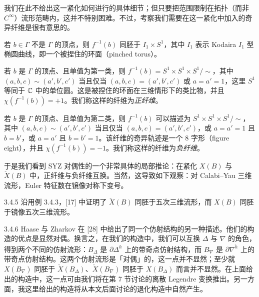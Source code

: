 我们在此不给出这一紧化如何进行的具体细节；但只要把范围限制在拓扑（而非 $C^\infty$）流形范畴内，这并不特别困难。不过，考察我们需要在这一紧化中加入的奇异纤维是很有意思的。

若 $b\in\Gamma$ 不是 $\Gamma$ 的顶点，则 $f^{-1}(b)$ 同胚于 $I_1\times S^1$，其中 $I_1$ 表示 Kodaira $I_1$ 型椭圆曲线，即一个被捏住的环面（pinched torus）。

若 $b$ 是 $\Gamma$ 的顶点、且单值为第一类，则 $f^{-1}(b)=S^1\times S^1\times S^1/{\sim}$，其中 $(a,b,c)\sim(a',b',c')$ 当且仅当 $(a,b,c)=(a',b',c')$ 或 $a=a'=1$，这里 $S^1$ 等同于 $\mathbb{C}$ 中的单位圆。这是被捏住的环面在三维情形下的类比物，并且 $\chi(f^{-1}(b))=+1$。我们称这样的纤维为\emph{正纤维}。

若 $b$ 是 $\Gamma$ 的顶点、且单值为第二类，则 $f^{-1}(b)$ 可以描述为 $S^1\times S^1\times S^1/{\sim}$，其中 $(a,b,c)\sim(a',b',c')$ 当且仅当 $(a,b,c)=(a',b',c')$，或 $a=a'=1$ 且 $b=b'$，或 $a=a'$ 且 $b=b'=1$。该纤维的奇异轨迹是一个 8 字形（figure eight），并且 $\chi(f^{-1}(b))=-1$。我们称这样的纤维为\emph{负纤维}。


于是我们看到 SYZ 对偶性的一个非常具体的局部推论：在紧化 $X(B)$ 与 $\check X(B)$ 中，正纤维与负纤维互换。当然，这导致如下观察：对 Calabi--Yau 三维流形，Euler 特征数在镜像对称下变号。

\begin{example}{3.4.5}
沿用例 3.4.3，[17] 中证明了 $\check X(B)$ 同胚于五次三维流形，而 $X(B)$ 同胚于镜像五次三维流形。
\end{example}

\begin{remark}{3.4.6}
Haase 与 Zharkov 在 [28] 中给出了同一个仿射结构的另一种描述。他们的构造的优点是显然对偶。换言之，在我们的构造中，我们可以互换 $\Delta$ 与 $\nabla$ 的角色，得到两个不同的仿射流形：$B_\Delta$ 是 $\partial\Delta^h$ 上的带奇点仿射结构，而 $B_\nabla$ 是 $\partial\nabla^{\check h}$ 上的带奇点仿射结构。这两个仿射流形是「对偶」的，这一点并不显然；至少就 $X(B_\nabla)$ 同胚于 $\check X(B_\Delta)$、$\check X(B_\nabla)$ 同胚于 $X(B_\Delta)$ 而言并不显然。在上面给出的构造中，这一点可由我们将在第 7 节讨论的离散 Legendre 变换推出。另一方面，我这里给出的构造将从本文后面讨论的退化构造中自然产生。
\end{remark}

